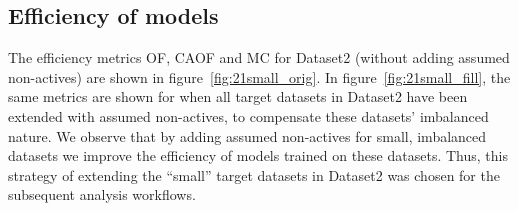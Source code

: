 \documentclass[10pt,article]{memoir}
\begin{document}
\subsection*{Efficiency of models}
The efficiency metrics OF, CAOF and MC for Dataset2 (without adding assumed
non-actives) are shown in figure~\ref{fig:21small_orig}. In
figure~\ref{fig:21small_fill}, the same metrics are shown for when all target
datasets in Dataset2 have been extended with assumed non-actives, to compensate
these datasets' imbalanced nature.
We observe that by adding assumed non-actives for small, imbalanced datasets we
improve the efficiency of models trained on these datasets. Thus, this strategy
of extending the ``small'' target datasets in Dataset2 was chosen for the
subsequent analysis workflows.
\end{document}
